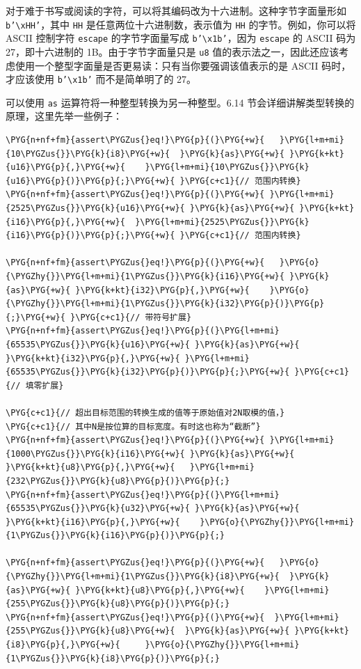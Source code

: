 对于难于书写或阅读的字符，可以将其编码改为十六进制。这种字节字面量形如 \texttt{b'\textbackslash{}xHH'}，其中 \texttt{HH} 是任意两位十六进制数，表示值为 \texttt{HH} 的字节。例如，你可以将 ASCII 控制字符 \texttt{escape} 的字节字面量写成 \texttt{b'\textbackslash{}x1b'}，因为 \texttt{escape} 的 ASCII 码为 27，即十六进制的 1B。由于字节字面量只是 \texttt{u8} 值的表示法之一，因此还应该考虑使用一个整型字面量是否更易读：只有当你要强调该值表示的是 ASCII 码时，才应该使用 \texttt{b'\textbackslash{}x1b'} 而不是简单明了的 27。

可以使用 \texttt{as} 运算符将一种整型转换为另一种整型。6.14 节会详细讲解类型转换的原理，这里先举一些例子：

\begin{Verbatim}[commandchars=\\\{\},breaklines=true,breakanywhere=true,fontsize=\codefont,xleftmargin=17bp]
\PYG{n+nf+fm}{assert\PYGZus{}eq!}\PYG{p}{(}\PYG{+w}{   }\PYG{l+m+mi}{10\PYGZus{}}\PYG{k}{i8}\PYG{+w}{  }\PYG{k}{as}\PYG{+w}{ }\PYG{k+kt}{u16}\PYG{p}{,}\PYG{+w}{    }\PYG{l+m+mi}{10\PYGZus{}}\PYG{k}{u16}\PYG{p}{)}\PYG{p}{;}\PYG{+w}{ }\PYG{c+c1}{// 范围内转换}
\PYG{n+nf+fm}{assert\PYGZus{}eq!}\PYG{p}{(}\PYG{+w}{ }\PYG{l+m+mi}{2525\PYGZus{}}\PYG{k}{u16}\PYG{+w}{ }\PYG{k}{as}\PYG{+w}{ }\PYG{k+kt}{i16}\PYG{p}{,}\PYG{+w}{  }\PYG{l+m+mi}{2525\PYGZus{}}\PYG{k}{i16}\PYG{p}{)}\PYG{p}{;}\PYG{+w}{ }\PYG{c+c1}{// 范围内转换}

\PYG{n+nf+fm}{assert\PYGZus{}eq!}\PYG{p}{(}\PYG{+w}{   }\PYG{o}{\PYGZhy{}}\PYG{l+m+mi}{1\PYGZus{}}\PYG{k}{i16}\PYG{+w}{ }\PYG{k}{as}\PYG{+w}{ }\PYG{k+kt}{i32}\PYG{p}{,}\PYG{+w}{    }\PYG{o}{\PYGZhy{}}\PYG{l+m+mi}{1\PYGZus{}}\PYG{k}{i32}\PYG{p}{)}\PYG{p}{;}\PYG{+w}{ }\PYG{c+c1}{// 带符号扩展}
\PYG{n+nf+fm}{assert\PYGZus{}eq!}\PYG{p}{(}\PYG{l+m+mi}{65535\PYGZus{}}\PYG{k}{u16}\PYG{+w}{ }\PYG{k}{as}\PYG{+w}{ }\PYG{k+kt}{i32}\PYG{p}{,}\PYG{+w}{ }\PYG{l+m+mi}{65535\PYGZus{}}\PYG{k}{i32}\PYG{p}{)}\PYG{p}{;}\PYG{+w}{ }\PYG{c+c1}{// 填零扩展}

\PYG{c+c1}{// 超出目标范围的转换生成的值等于原始值对2N取模的值，}
\PYG{c+c1}{// 其中N是按位算的目标宽度。有时这也称为“截断”}
\PYG{n+nf+fm}{assert\PYGZus{}eq!}\PYG{p}{(}\PYG{+w}{ }\PYG{l+m+mi}{1000\PYGZus{}}\PYG{k}{i16}\PYG{+w}{ }\PYG{k}{as}\PYG{+w}{  }\PYG{k+kt}{u8}\PYG{p}{,}\PYG{+w}{   }\PYG{l+m+mi}{232\PYGZus{}}\PYG{k}{u8}\PYG{p}{)}\PYG{p}{;}
\PYG{n+nf+fm}{assert\PYGZus{}eq!}\PYG{p}{(}\PYG{l+m+mi}{65535\PYGZus{}}\PYG{k}{u32}\PYG{+w}{ }\PYG{k}{as}\PYG{+w}{ }\PYG{k+kt}{i16}\PYG{p}{,}\PYG{+w}{    }\PYG{o}{\PYGZhy{}}\PYG{l+m+mi}{1\PYGZus{}}\PYG{k}{i16}\PYG{p}{)}\PYG{p}{;}

\PYG{n+nf+fm}{assert\PYGZus{}eq!}\PYG{p}{(}\PYG{+w}{   }\PYG{o}{\PYGZhy{}}\PYG{l+m+mi}{1\PYGZus{}}\PYG{k}{i8}\PYG{+w}{  }\PYG{k}{as}\PYG{+w}{ }\PYG{k+kt}{u8}\PYG{p}{,}\PYG{+w}{    }\PYG{l+m+mi}{255\PYGZus{}}\PYG{k}{u8}\PYG{p}{)}\PYG{p}{;}
\PYG{n+nf+fm}{assert\PYGZus{}eq!}\PYG{p}{(}\PYG{+w}{  }\PYG{l+m+mi}{255\PYGZus{}}\PYG{k}{u8}\PYG{+w}{  }\PYG{k}{as}\PYG{+w}{ }\PYG{k+kt}{i8}\PYG{p}{,}\PYG{+w}{     }\PYG{o}{\PYGZhy{}}\PYG{l+m+mi}{1\PYGZus{}}\PYG{k}{i8}\PYG{p}{)}\PYG{p}{;}
\end{Verbatim}

